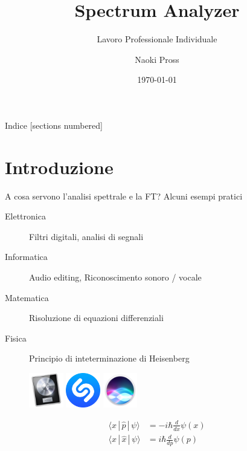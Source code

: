 \documentclass[10pt, xetex]{beamer}
\title{Spectrum Analyzer}
\subtitle{Lavoro Professionale Individuale}
\date{\today}
\author{Naoki Pross}
\institute{SAM Bellinzona}
\begin{document}
\maketitle

\begin{frame}{Indice}
    [sections numbered]
    \tableofcontents[hideallsubsections]
\end{frame}

\section{Introduzione}
\begin{frame}{A cosa servono l'analisi spettrale e la FT?}
    \vfill
    Alcuni esempi pratici
    \begin{description}
        \item [Elettronica] Filtri digitali, analisi di segnali
        \item [Informatica] Audio editing, Riconoscimento sonoro / vocale
        \item [Matematica] Risoluzione di equazioni differenziali
        \item [Fisica] Principio di inteterminazione di Heisenberg
    \end{description}
    \vfill
    \begin{figure} \centering
        \includegraphics[height=1.5cm]{figures/logo/logic}
        \hfill
        \includegraphics[height=1.5cm]{figures/logo/shazam}
        \hfill
        \includegraphics[height=1.5cm]{figures/logo/siri}
        \hfill
        \begin{minipage}[b][1.5cm][c]{.25\linewidth}
        \begin{align*}
            \langle x\,|\,\hat p\,|\,\psi \rangle &= 
                -i\mathbf{\hbar}\frac{d}{dx} \psi(x) \\
            \langle x\,|\,\hat x\,|\,\psi \rangle &= 
                i\mathbf{\hbar}\frac{d}{dp} \psi(p) \\
        \end{align*}
        \end{minipage}
    \end{figure}
\end{frame}
\end{document}
